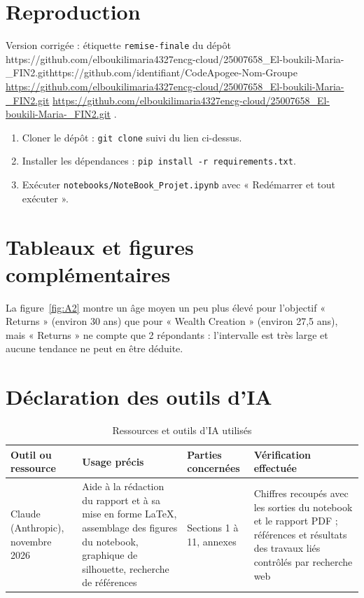 \documentclass[11pt,a4paper]{article}
\newcounter{nbacompleter}
\newcommand{\lienDepot}{https://github.com/elboukilimaria4327encg-cloud/25007658_El-boukili-Maria-_FIN2.git}
\newcommand{\lienParDefaut}{https://github.com/identifiant/CodeApogee-Nom-Groupe}
\newcommand{\afficherlien}{%
  \ifx\lienDepot\lienParDefaut
    \stepcounter{nbacompleter}\textcolor{red}{\expandafter\url\expandafter{\lienDepot}}%
  \else
    \expandafter\url\expandafter{\lienDepot}%
  \fi}
\begin{document}
\appendix

\section{Reproduction}
\label{ann:reproduction}
Version corrigée : étiquette \texttt{remise-finale} du dépôt \afficherlien.
\begin{enumerate}
  \item Cloner le dépôt : \texttt{git clone} suivi du lien ci-dessus.
  \item Installer les dépendances : \texttt{pip install -r requirements.txt}.
  \item Exécuter \texttt{notebooks/NoteBook\_Projet.ipynb} avec « Redémarrer et tout exécuter ».
\end{enumerate}

\section{Tableaux et figures complémentaires}
\label{ann:complements}


La figure~\ref{fig:A2} montre un âge moyen un peu plus élevé pour l'objectif « Returns » (environ 30 ans) que pour « Wealth Creation » (environ 27,5 ans), mais « Returns » ne compte que 2 répondants : l'intervalle est très large et aucune tendance ne peut en être déduite.

\section{Déclaration des outils d'IA}
\label{ann:ia}
\begin{table}[htbp]
  \centering
  \caption{Ressources et outils d'IA utilisés}
  \label{tab:ia}
  \small
  \begin{tabular}{@{}P{3cm} P{4.8cm} P{3.3cm} P{4.4cm}@{}}
    \toprule
    Outil ou ressource & Usage précis & Parties concernées & Vérification effectuée \\
    \midrule
    Claude (Anthropic), novembre 2026 & Aide à la rédaction du rapport et à sa mise en forme LaTeX, assemblage des figures du notebook, graphique de silhouette, recherche de références & Sections 1 à 11, annexes & Chiffres recoupés avec les sorties du notebook et le rapport PDF ; références et résultats des travaux liés contrôlés par recherche web \\
    \bottomrule
  \end{tabular}
\end{table}
\end{document}
